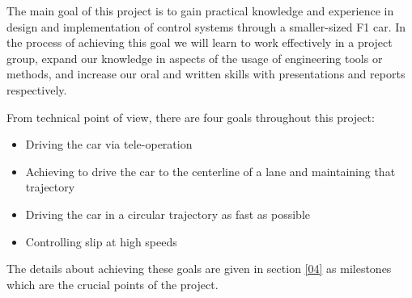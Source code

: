 The main goal of this project is to gain practical knowledge and experience in
design and implementation of control systems through a smaller-sized F1 car. In
the process of achieving this goal we will learn to work effectively in a
project group, expand our knowledge in aspects of the usage of engineering tools
or methods, and increase our oral and written skills with presentations and
reports respectively.

From technical point of view, there are four goals throughout this project:

\begin{itemize}
  \item Driving the car via tele-operation
  \item Achieving to drive the car to the centerline of a lane and maintaining that trajectory
  \item Driving the car in a circular trajectory as fast as possible
  \item Controlling slip at high speeds
\end{itemize}

The details about achieving these goals are given in section \ref{04} as milestones
which are the crucial points of the project.
